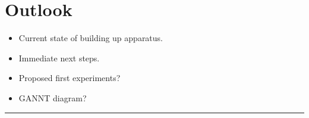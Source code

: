 \documentclass[12pt]{iopart}
\begin{document}






\section{Outlook}
\begin{itemize}
    \item Current state of building up apparatus.
    \item Immediate next steps.
    \item Proposed first experiments?
    \item GANNT diagram?
\end{itemize}

\hrule
  
\end{document}
